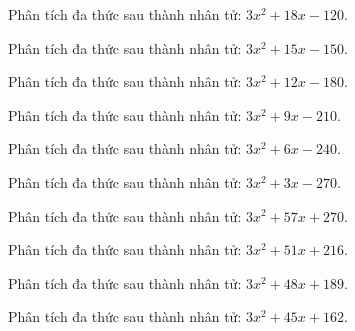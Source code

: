 \begin{bt}
	Phân tích đa thức sau thành nhân tử: $3 x^2 + 18 x - 120$.
\end{bt}
\begin{bt}
	Phân tích đa thức sau thành nhân tử: $3 x^2 + 15 x - 150$.
\end{bt}
\begin{bt}
	Phân tích đa thức sau thành nhân tử: $3 x^2 + 12 x - 180$.
\end{bt}
\begin{bt}
	Phân tích đa thức sau thành nhân tử: $3 x^2 + 9 x - 210$.
\end{bt}
\begin{bt}
	Phân tích đa thức sau thành nhân tử: $3 x^2 + 6 x - 240$.
\end{bt}
\begin{bt}
	Phân tích đa thức sau thành nhân tử: $3 x^2 + 3 x - 270$.
\end{bt}
\begin{bt}
	Phân tích đa thức sau thành nhân tử: $3 x^2 + 57 x + 270$.
\end{bt}
\begin{bt}
	Phân tích đa thức sau thành nhân tử: $3 x^2 + 51 x + 216$.
\end{bt}
\begin{bt}
	Phân tích đa thức sau thành nhân tử: $3 x^2 + 48 x + 189$.
\end{bt}
\begin{bt}
	Phân tích đa thức sau thành nhân tử: $3 x^2 + 45 x + 162$.
\end{bt}
